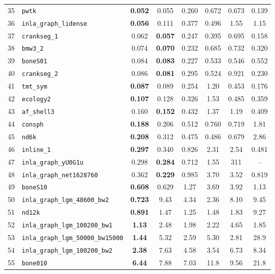 \begin{footnotesize}
\begin{longtable}{rl cccccc}
35 & \texttt{pwtk} & \textbf{0.052} & 0.055 & 0.260 & 0.672 & 0.673 & 0.139 \\
36 & \texttt{inla\_graph\_lidense} & \textbf{0.056} & 0.111 & 0.377 & 0.496 & 1.55 & 1.15 \\
37 & \texttt{crankseg\_1} & 0.062 & \textbf{0.057} & 0.247 & 0.395 & 0.695 & 0.158 \\
38 & \texttt{bmw3\_2} & 0.074 & \textbf{0.070} & 0.232 & 0.685 & 0.732 & 0.320 \\
39 & \texttt{boneS01} & 0.084 & \textbf{0.083} & 0.227 & 0.533 & 0.546 & 0.552 \\
40 & \texttt{crankseg\_2} & 0.086 & \textbf{0.081} & 0.295 & 0.524 & 0.921 & 0.230 \\
41 & \texttt{tmt\_sym} & \textbf{0.087} & 0.089 & 0.254 & 1.20 & 0.453 & 0.176 \\
42 & \texttt{ecology2} & \textbf{0.107} & 0.128 & 0.326 & 1.53 & 0.485 & 0.359 \\
43 & \texttt{af\_shell3} & 0.160 & \textbf{0.152} & 0.432 & 1.37 & 1.19 & 0.409 \\
44 & \texttt{consph} & \textbf{0.188} & 0.206 & 0.512 & 0.760 & 0.719 & 1.81 \\
45 & \texttt{nd6k} & \textbf{0.208} & 0.312 & 0.475 & 0.486 & 0.679 & 2.86 \\
46 & \texttt{inline\_1} & \textbf{0.297} & 0.340 & 0.826 & 2.31 & 2.54 & 0.481 \\
47 & \texttt{inla\_graph\_yU0G1u} & 0.298 & \textbf{0.284} & 0.712 & 1.55 & 311 & -- \\
48 & \texttt{inla\_graph\_net1628760} & 0.362 & \textbf{0.229} & 0.985 & 3.70 & 3.52 & 0.819 \\
49 & \texttt{boneS10} & \textbf{0.608} & 0.629 & 1.27 & 3.69 & 3.92 & 1.13 \\
50 & \texttt{inla\_graph\_lgm\_48600\_bw2} & \textbf{0.723} & 9.43 & 4.34 & 2.36 & 8.10 & 9.45 \\
51 & \texttt{nd12k} & \textbf{0.891} & 1.47 & 1.25 & 1.48 & 1.83 & 9.27 \\
52 & \texttt{inla\_graph\_lgm\_100200\_bw1} & \textbf{1.13} & 2.48 & 1.98 & 2.22 & 4.65 & 1.85 \\
53 & \texttt{inla\_graph\_lgm\_50000\_bw15000} & \textbf{1.44} & 5.32 & 2.59 & 5.30 & 2.81 & 28.9 \\
54 & \texttt{inla\_graph\_lgm\_100200\_bw2} & \textbf{2.38} & 7.63 & 4.58 & 3.54 & 6.73 & 8.34 \\
55 & \texttt{bone010} & \textbf{6.44} & 7.88 & 7.03 & 11.8 & 9.56 & 21.8 \\

\end{longtable}
\end{footnotesize}
